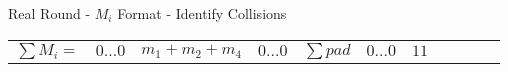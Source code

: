 \begin{frame}{Real Round - $M_i$ Format - Identify Collisions}
\begin{table}[]
\begin{tabular}{ccccccrllll}
\multicolumn{1}{c|}{$\sum M_i = $} & \multicolumn{1}{c|}{$0 \dotsc 0$} & \multicolumn{1}{c|}{$m_1 + m_2 + m_4$} & \multicolumn{1}{c|}{$0 \dotsc 0$} & \multicolumn{1}{c|}{$\sum pad$} & \multicolumn{1}{c|}{$0 \dotsc 0$} & \multicolumn{1}{r|}{$11$} &  &  &  &  \\ \cline{2-7}
\end{tabular}
\end{table}

\end{frame}